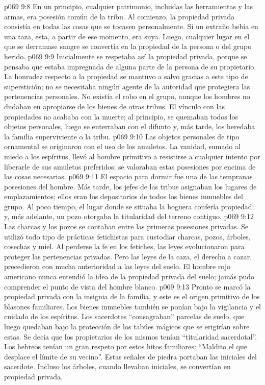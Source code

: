 \vs p069 9:8 En un principio, cualquier patrimonio, incluidas las herramientas y las armas, era posesión común de la tribu. Al comienzo, la propiedad privada consistía en todas las cosas que se tocasen personalmente. Si un extraño bebía en una taza, esta, a partir de ese momento, era suya. Luego, cualquier lugar en el que se derramase sangre se convertía en la propiedad de la persona o del grupo herido.
\vs p069 9:9 Inicialmente se respetaba así la propiedad privada, porque se pensaba que estaba impregnada de alguna parte de la persona de su propietario. La honradez respecto a la propiedad se mantuvo a salvo gracias a este tipo de superstición; no se necesitaba ningún agente de la autoridad que protegiera las pertenencias personales. No existía el robo en el grupo, aunque los hombres no dudaban en apropiarse de los bienes de otras tribus. El vínculo con las propiedades no acababa con la muerte; al principio, se quemaban todos los objetos personales, luego se enterraban con el difunto y, más tarde, los heredaba la familia superviviente o la tribu.
\vs p069 9:10 Las objetos personales de tipo ornamental se originaron con el uso de los amuletos. La vanidad, sumado al miedo a los espíritus, llevó al hombre primitivo a resistirse a cualquier intento por liberarle de sus amuletos preferidos; se valoraban estas posesiones por encima de las cosas necesarias.
\vs p069 9:11 \pc El espacio para dormir fue una de las tempranas posesiones del hombre. Más tarde, los jefes de las tribus asignaban los lugares de emplazamientos; ellos eran los depositarios de todos los bienes inmuebles del grupo. Al poco tiempo, el lugar donde se situaba la hoguera confería propiedad; y, más adelante, un pozo otorgaba la titularidad del terreno contiguo.
\vs p069 9:12 Las charcas y los pozos se contaban entre las primeras posesiones privadas. Se utilizó todo tipo de prácticas fetichistas para custodiar charcas, pozos, árboles, cosechas y miel. Al perderse la fe en los fetiches, las leyes evolucionaron para proteger las pertenencias privadas. Pero las leyes de la caza, el derecho a cazar, precedieron con mucha anterioridad a las leyes del suelo. El hombre rojo americano nunca entendió la idea de la propiedad privada del suelo; jamás pudo comprender el punto de vista del hombre blanco.
\vs p069 9:13 Pronto se marcó la propiedad privada con la insignia de la familia, y este es el origen primitivo de los blasones familiares. Los bienes inmuebles también se ponían bajo la vigilancia y el cuidado de los espíritus. Los sacerdotes “consagraban” parcelas de suelo, que luego quedaban bajo la protección de los tabúes mágicos que se erigirían sobre estas. Se decía que los propietarios de los mismos tenían “titularidad sacerdotal”. Los hebreos tenían un gran respeto por estos hitos familiares: “Maldito el que desplace el límite de su vecino”. Estas señales de piedra portaban las iniciales del sacerdote. Incluso los árboles, cuando llevaban iniciales, se convertían en propiedad privada.
